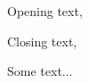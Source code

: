 \documentclass[11pt,a4paper,sans]{moderncv}        %
\begin{document}
\clearpage
\date{Date}
\opening{Opening text,}
\closing{Closing text,}
\makelettertitle

Some text...

\makeletterclosing

\end{document}
